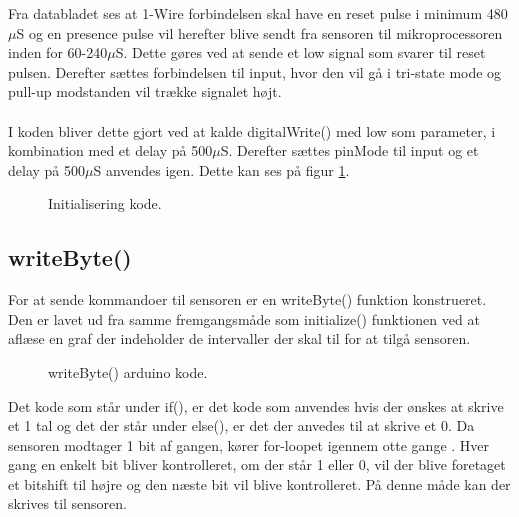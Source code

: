 Fra databladet ses at 1-Wire forbindelsen skal have en reset pulse i minimum 480$\mu$S og en presence pulse vil herefter blive sendt fra sensoren til mikroprocessoren inden for 60-240$\mu$S. Dette gøres ved at sende et low signal som svarer til reset pulsen. Derefter sættes forbindelsen til input, hvor den vil gå i tri-state mode og pull-up modstanden vil trække signalet højt. 
\\
\\
I koden bliver dette gjort ved at kalde digitalWrite() med low som parameter, i kombination med et delay på 500$\mu$S. Derefter sættes pinMode til input og et delay på 500$\mu$S anvendes igen. Dette kan ses på figur \ref{sensor_kode}.

\begin{figure}[h!]
  \centering
  \caption{Initialisering kode.}
  \label{sensor_kode}
\end{figure}
\newpage
\subsection{writeByte()}
For at sende kommandoer til sensoren er en writeByte() funktion konstrueret. Den er lavet ud fra samme fremgangsmåde som initialize() funktionen ved at aflæse en graf der indeholder de intervaller der skal til for at tilgå sensoren.

\begin{figure}[h!]
  \centering
  \caption{writeByte() arduino kode.}
  \label{write_byte}
\end{figure}
Det kode som står under if(), er det kode som anvendes hvis der ønskes at skrive et 1 tal og det der står under else(), er det der anvedes til at skrive et 0. Da sensoren modtager 1 bit af gangen, kører for-loopet igennem otte gange . Hver gang en enkelt bit bliver kontrolleret, om der står 1 eller 0, vil der blive foretaget et bitshift til højre og den næste bit vil blive kontrolleret. På denne måde kan der skrives til sensoren.
